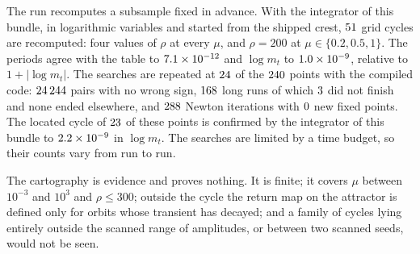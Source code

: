 \begin{table}[ht]
\centering\small\setlength{\tabcolsep}{4.5pt}
\caption{$\log m_t=\lambda_cT$ on part of the grid (floating point; from \texttt{grid\_table.csv}).}\label{num:tab:cartography}

\end{table}

The run recomputes a subsample fixed in advance. With the integrator of this bundle, in logarithmic variables and started from the shipped crest, $51$ grid cycles are recomputed: four values of $\rho$ at every $\mu$, and $\rho=200$ at $\mu\in\{0.2,0.5,1\}$. The periods agree with the table to $7.1\times10^{-12}$ and $\log m_t$ to $1.0\times10^{-9}$, relative to $1+|\log m_t|$. The searches are repeated at $24$ of the $240$ points with the compiled code: $24\,244$ pairs with no wrong sign, $168$ long runs of which $3$ did not finish and none ended elsewhere, and $288$ Newton iterations with $0$ new fixed points. The located cycle of $23$ of these points is confirmed by the integrator of this bundle to $2.2\times10^{-9}$ in $\log m_t$. The searches are limited by a time budget, so their counts vary from run to run.

The cartography is evidence and proves nothing. It is finite; it covers $\mu$ between $10^{-3}$ and $10^{3}$ and $\rho\le300$; outside the cycle the return map on the attractor is defined only for orbits whose transient has decayed; and a family of cycles lying entirely outside the scanned range of amplitudes, or between two scanned seeds, would not be seen.

